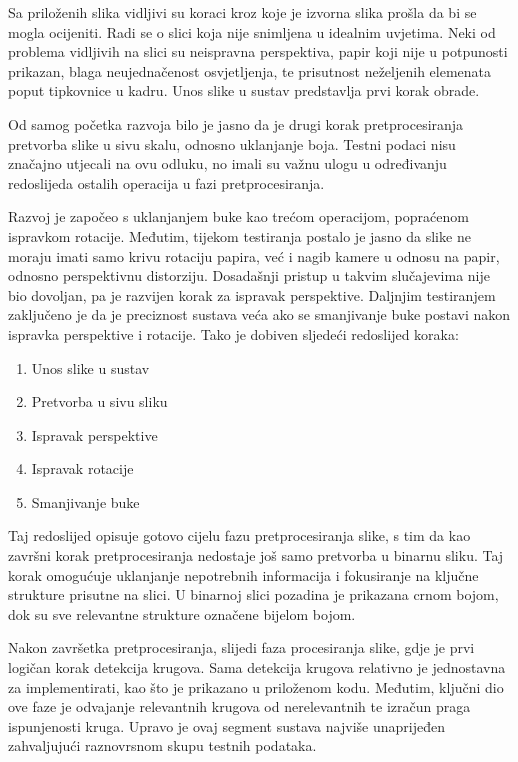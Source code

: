 \documentclass{foi}
\begin{document}
Sa priloženih slika vidljivi su koraci kroz koje je izvorna slika prošla da bi se mogla ocijeniti. Radi se o slici koja nije snimljena u idealnim uvjetima. Neki od problema vidljivih na slici su neispravna perspektiva, papir koji nije u potpunosti prikazan, blaga neujednačenost osvjetljenja, te prisutnost neželjenih elemenata poput tipkovnice u kadru. Unos slike u sustav predstavlja prvi korak obrade.

Od samog početka razvoja bilo je jasno da je drugi korak pretprocesiranja pretvorba slike u sivu skalu, odnosno uklanjanje boja. Testni podaci nisu značajno utjecali na ovu odluku, no imali su važnu ulogu u određivanju redoslijeda ostalih operacija u fazi pretprocesiranja.

Razvoj je započeo s uklanjanjem buke kao trećom operacijom, popraćenom ispravkom rotacije. Međutim, tijekom testiranja postalo je jasno da slike ne moraju imati samo krivu rotaciju papira, već i nagib kamere u odnosu na papir, odnosno perspektivnu distorziju. Dosadašnji pristup u takvim slučajevima nije bio dovoljan, pa je razvijen korak za ispravak perspektive. Daljnjim testiranjem zaključeno je da je preciznost sustava veća ako se smanjivanje buke postavi nakon ispravka perspektive i rotacije. Tako je dobiven sljedeći redoslijed koraka:

\begin{enumerate}
    \item Unos slike u sustav
    \item Pretvorba u sivu sliku
    \item Ispravak perspektive
    \item Ispravak rotacije
    \item Smanjivanje buke
\end{enumerate}

Taj redoslijed opisuje gotovo cijelu fazu pretprocesiranja slike, s tim da kao završni korak pretprocesiranja nedostaje još samo pretvorba u binarnu sliku. Taj korak omogućuje uklanjanje nepotrebnih informacija i fokusiranje na ključne strukture prisutne na slici. U binarnoj slici pozadina je prikazana crnom bojom, dok su sve relevantne strukture označene bijelom bojom.

Nakon završetka pretprocesiranja, slijedi faza procesiranja slike, gdje je prvi logičan korak detekcija krugova. Sama detekcija krugova relativno je jednostavna za implementirati, kao što je prikazano u priloženom kodu. Međutim, ključni dio ove faze je odvajanje relevantnih krugova od nerelevantnih te izračun praga ispunjenosti kruga. Upravo je ovaj segment sustava najviše unaprijeđen zahvaljujući raznovrsnom skupu testnih podataka.
\end{document}
